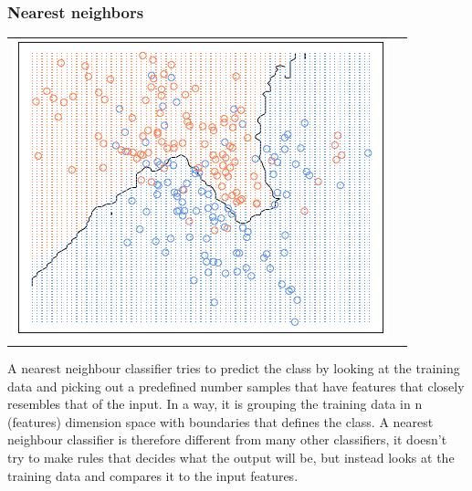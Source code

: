 \documentclass[12pt]{article}
\begin{document}
\subsubsection{Nearest neighbors}
\begin{center}
\begin{tabular}{cc}
\includegraphics[scale = 0.5]{knn.png}
\end{tabular}
\end{center}
A nearest neighbour classifier tries to predict the class by looking at the training data and picking out a predefined number samples that have \newline features that closely resembles that of the input. In a way, it is grouping the training data in n (features) dimension space with boundaries that defines the class. A nearest neighbour classifier is therefore different from many other classifiers, it doesn’t try to make rules that decides what the output will be, but instead looks at the training data and compares it to the input features.
\end{document}
